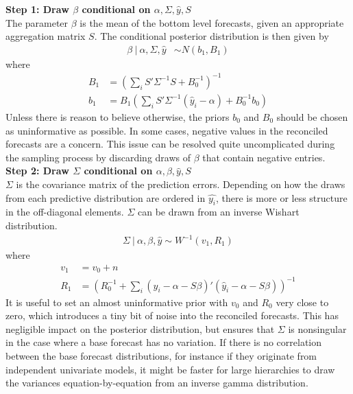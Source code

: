 \documentclass[a4paper,fleqn,11pt]{article}
\begin{document}
\noindent\textbf{Step 1: Draw $\beta$ conditional on $\alpha,\Sigma,\hat{y},S$}\\
The parameter $\beta$ is the mean of the bottom level forecasts, given an appropriate aggregation matrix $S$. The conditional posterior distribution is then given by
\begin{align}
\beta\ |\ \alpha,\Sigma,\hat{y} &\sim N(b_1,B_1)
\end{align}
where
\begin{align*}
B_1 &= \left(\sum_i S'\Sigma^{-1}S + B_0^{-1}\right)^{-1} \\
b_1 &= B_1 \left(\sum_i S'\Sigma^{-1} (\hat{y}_i - \alpha) + B_0^{-1}b_0\right)
\end{align*}
Unless there is reason to believe otherwise, the priors $b_0$ and $B_0$ should be chosen as uninformative as possible. In some cases, negative values in the reconciled forecasts are a concern. This issue can be resolved quite uncomplicated during the sampling process by discarding draws of $\beta$ that contain negative entries.\\

\noindent\textbf{Step 2: Draw $\Sigma$ conditional on $\alpha,\beta,\hat{y},S$}\\
$\Sigma$ is the covariance matrix of the prediction errors. Depending on how the draws from each predictive distribution are ordered in $\hat{y_i}$, there is more or less structure in the off-diagonal elements. $\Sigma$ can be drawn from an inverse Wishart distribution.
\begin{align}
\Sigma\ |\ \alpha,\beta,\hat{y} \sim W^{-1}(v_1,R_1)
\end{align}
where
\begin{align*}
v_1 &= v_0 + n\\
R_1 &=  \left( R_0^{-1} + \sum_i (\hat{y}_i - \alpha - S \beta)'(\hat{y}_i - \alpha - S \beta) \right)^{-1}
\end{align*}
It is useful to set an almost uninformative prior with $v_0$ and $R_0$ very close to zero, which introduces a tiny bit of noise into the reconciled forecasts. This has negligible impact on the posterior distribution, but ensures that $\Sigma$ is nonsingular in the case where a base forecast has no variation. If there is no correlation between the base forecast distributions, for instance if they originate from independent univariate models, it might be faster for large hierarchies to draw the variances equation-by-equation from an inverse gamma distribution.\\
\end{document}
